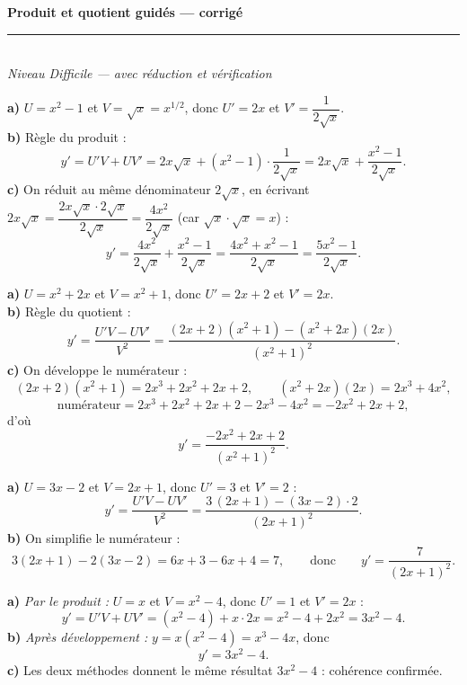 \pagestyle{fancy}\fancyhf{}
\fancyfoot[C]{\small\thepage}
\renewcommand{\headrulewidth}{0.8pt}



\begin{center}
{\LARGE\bfseries\color{primarydark} Produit et quotient guidés --- corrigé}\\[2pt]
{\color{primary}\rule{0.5\textwidth}{1.2pt}}\\[4pt]
{\small\itshape Niveau Difficile --- avec réduction et vérification}
\end{center}
\vspace{2mm}

\begin{corr}
\textbf{a)} $U=x^{2}-1$ et $V=\sqrt{x}=x^{1/2}$, donc $U'=2x$ et $V'=\dfrac{1}{2\sqrt{x}}$.\\[2pt]
\textbf{b)} Règle du produit :
\[
y'=U'V+UV'=2x\sqrt{x}+(x^{2}-1)\cdot\frac{1}{2\sqrt{x}}
=2x\sqrt{x}+\frac{x^{2}-1}{2\sqrt{x}}.
\]
\textbf{c)} On réduit au même dénominateur $2\sqrt{x}$, en écrivant $2x\sqrt{x}=\dfrac{2x\sqrt{x}\cdot 2\sqrt{x}}{2\sqrt{x}}=\dfrac{4x^{2}}{2\sqrt{x}}$ (car $\sqrt{x}\cdot\sqrt{x}=x$) :
\[
y'=\frac{4x^{2}}{2\sqrt{x}}+\frac{x^{2}-1}{2\sqrt{x}}
=\frac{4x^{2}+x^{2}-1}{2\sqrt{x}}=\frac{5x^{2}-1}{2\sqrt{x}}.
\]
\end{corr}

\begin{corr}
\textbf{a)} $U=x^{2}+2x$ et $V=x^{2}+1$, donc $U'=2x+2$ et $V'=2x$.\\[2pt]
\textbf{b)} Règle du quotient :
\[
y'=\frac{U'V-UV'}{V^{2}}
=\frac{(2x+2)(x^{2}+1)-(x^{2}+2x)(2x)}{(x^{2}+1)^{2}}.
\]
\textbf{c)} On développe le numérateur :
\[
(2x+2)(x^{2}+1)=2x^{3}+2x^{2}+2x+2,\qquad (x^{2}+2x)(2x)=2x^{3}+4x^{2},
\]
\[
\text{numérateur}=2x^{3}+2x^{2}+2x+2-2x^{3}-4x^{2}=-2x^{2}+2x+2,
\]
d'où
\[
y'=\frac{-2x^{2}+2x+2}{(x^{2}+1)^{2}}.
\]
\end{corr}

\begin{corr}
\textbf{a)} $U=3x-2$ et $V=2x+1$, donc $U'=3$ et $V'=2$ :
\[
y'=\frac{U'V-UV'}{V^{2}}=\frac{3\,(2x+1)-(3x-2)\cdot 2}{(2x+1)^{2}}.
\]
\textbf{b)} On simplifie le numérateur :
\[
3(2x+1)-2(3x-2)=6x+3-6x+4=7,
\qquad\text{donc}\qquad
y'=\frac{7}{(2x+1)^{2}}.
\]
\end{corr}

\begin{corr}
\textbf{a)} \emph{Par le produit :} $U=x$ et $V=x^{2}-4$, donc $U'=1$ et $V'=2x$ :
\[
y'=U'V+UV'=(x^{2}-4)+x\cdot 2x=x^{2}-4+2x^{2}=3x^{2}-4.
\]
\textbf{b)} \emph{Après développement :} $y=x(x^{2}-4)=x^{3}-4x$, donc
\[
y'=3x^{2}-4.
\]
\textbf{c)} Les deux méthodes donnent le même résultat $3x^{2}-4$ : cohérence confirmée. \checkmark
\end{corr}


